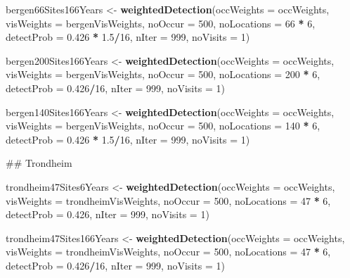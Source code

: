 \documentclass[]{article}
\newenvironment{Shaded}{\begin{snugshade}}{\end{snugshade}}
\newcommand{\KeywordTok}[1]{\textcolor[rgb]{0.13,0.29,0.53}{\textbf{#1}}}
\newcommand{\DataTypeTok}[1]{\textcolor[rgb]{0.13,0.29,0.53}{#1}}
\newcommand{\DecValTok}[1]{\textcolor[rgb]{0.00,0.00,0.81}{#1}}
\newcommand{\FloatTok}[1]{\textcolor[rgb]{0.00,0.00,0.81}{#1}}
\newcommand{\StringTok}[1]{\textcolor[rgb]{0.31,0.60,0.02}{#1}}
\newcommand{\OperatorTok}[1]{\textcolor[rgb]{0.81,0.36,0.00}{\textbf{#1}}}
\newcommand{\NormalTok}[1]{#1}
\begin{document}
\begin{Shaded}
\begin{Highlighting}[]
\NormalTok{bergen66Sites166Years <-}\StringTok{ }\KeywordTok{weightedDetection}\NormalTok{(}\DataTypeTok{occWeights =}\NormalTok{ occWeights, }\DataTypeTok{visWeights =}\NormalTok{ bergenVisWeights, }
    \DataTypeTok{noOccur =} \DecValTok{500}\NormalTok{, }\DataTypeTok{noLocations =} \DecValTok{66} \OperatorTok{*}\StringTok{ }\DecValTok{6}\NormalTok{, }\DataTypeTok{detectProb =} \FloatTok{0.426} \OperatorTok{*}\StringTok{ }\FloatTok{1.5}\OperatorTok{/}\DecValTok{16}\NormalTok{, }\DataTypeTok{nIter =} \DecValTok{999}\NormalTok{, }
    \DataTypeTok{noVisits =} \DecValTok{1}\NormalTok{)}

\NormalTok{bergen200Sites166Years <-}\StringTok{ }\KeywordTok{weightedDetection}\NormalTok{(}\DataTypeTok{occWeights =}\NormalTok{ occWeights, }\DataTypeTok{visWeights =}\NormalTok{ bergenVisWeights, }
    \DataTypeTok{noOccur =} \DecValTok{500}\NormalTok{, }\DataTypeTok{noLocations =} \DecValTok{200} \OperatorTok{*}\StringTok{ }\DecValTok{6}\NormalTok{, }\DataTypeTok{detectProb =} \FloatTok{0.426}\OperatorTok{/}\DecValTok{16}\NormalTok{, }\DataTypeTok{nIter =} \DecValTok{999}\NormalTok{, }
    \DataTypeTok{noVisits =} \DecValTok{1}\NormalTok{)}

\NormalTok{bergen140Sites166Years <-}\StringTok{ }\KeywordTok{weightedDetection}\NormalTok{(}\DataTypeTok{occWeights =}\NormalTok{ occWeights, }\DataTypeTok{visWeights =}\NormalTok{ bergenVisWeights, }
    \DataTypeTok{noOccur =} \DecValTok{500}\NormalTok{, }\DataTypeTok{noLocations =} \DecValTok{140} \OperatorTok{*}\StringTok{ }\DecValTok{6}\NormalTok{, }\DataTypeTok{detectProb =} \FloatTok{0.426} \OperatorTok{*}\StringTok{ }\FloatTok{1.5}\OperatorTok{/}\DecValTok{16}\NormalTok{, }\DataTypeTok{nIter =} \DecValTok{999}\NormalTok{, }
    \DataTypeTok{noVisits =} \DecValTok{1}\NormalTok{)}




\NormalTok{## Trondheim}

\NormalTok{trondheim47Sites6Years <-}\StringTok{ }\KeywordTok{weightedDetection}\NormalTok{(}\DataTypeTok{occWeights =}\NormalTok{ occWeights, }\DataTypeTok{visWeights =}\NormalTok{ trondheimVisWeights, }
    \DataTypeTok{noOccur =} \DecValTok{500}\NormalTok{, }\DataTypeTok{noLocations =} \DecValTok{47} \OperatorTok{*}\StringTok{ }\DecValTok{6}\NormalTok{, }\DataTypeTok{detectProb =} \FloatTok{0.426}\NormalTok{, }\DataTypeTok{nIter =} \DecValTok{999}\NormalTok{, }\DataTypeTok{noVisits =} \DecValTok{1}\NormalTok{)}

\NormalTok{trondheim47Sites166Years <-}\StringTok{ }\KeywordTok{weightedDetection}\NormalTok{(}\DataTypeTok{occWeights =}\NormalTok{ occWeights, }\DataTypeTok{visWeights =}\NormalTok{ trondheimVisWeights, }
    \DataTypeTok{noOccur =} \DecValTok{500}\NormalTok{, }\DataTypeTok{noLocations =} \DecValTok{47} \OperatorTok{*}\StringTok{ }\DecValTok{6}\NormalTok{, }\DataTypeTok{detectProb =} \FloatTok{0.426}\OperatorTok{/}\DecValTok{16}\NormalTok{, }\DataTypeTok{nIter =} \DecValTok{999}\NormalTok{, }
    \DataTypeTok{noVisits =} \DecValTok{1}\NormalTok{)}


\end{Highlighting}
\end{Shaded}
\end{document}

